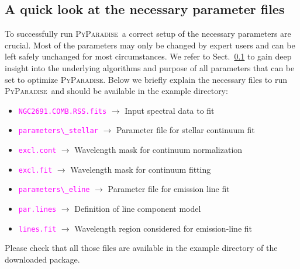 \documentclass[usenatbib,usegraphicx,useAMS,onecolumn]{mn2e}
\newcommand{\codeline}[1]{\lstinline|#1|}
\newcommand{\fname}[1]{\textcolor{magenta}{\codeline{#1}}}
\newcommand{\PyPar}{\mbox{\textsc{PyParadise}}}
\begin{document}
\subsection{A quick look at the necessary parameter files}
To successfully run \PyPar\ a correct setup of the necessary parameters are crucial. Most of the parameters may only be changed by expert users and can be left safely unchanged for most circumstances. We refer to Sect.~\ref{} to gain deep insight into the underlying algorithms and purpose of all parameters that can be set to optimize \PyPar. Below we briefly explain the necessary files to run \PyPar\ and should be available in the example directory:
\begin{itemize}
 \item \fname{NGC2691.COMB.RSS.fits} $\rightarrow$ Input spectral data to fit
 \item \fname{parameters\_stellar} $\rightarrow$ Parameter file for stellar continuum fit
 \item \fname{excl.cont} $\rightarrow$ Wavelength mask for continuum normalization
 \item \fname{excl.fit} $\rightarrow$ Wavelength mask for continuum fitting
 \item \fname{parameters\_eline} $\rightarrow$ Parameter file for emission line fit
 \item \fname{par.lines} $\rightarrow$ Definition of line component model
 \item \fname{lines.fit} $\rightarrow$ Wavelength region considered for emission-line fit
\end{itemize}
Please check that all those files are available in the example directory of the downloaded package. 
\end{document}
